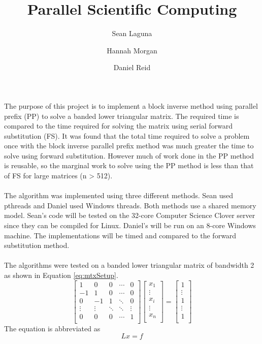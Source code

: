 \documentclass[a4paper,12pt]{article}
\title{Parallel Scientific Computing}
\author{Sean Laguna  \\
	\and 
	Hannah Morgan \\
	\and
	Daniel Reid \\
	}
\date{\vspace{-5ex}}
\begin{document}
\maketitle



\paragraph*{}
	The purpose of this project is to implement a block inverse method using parallel prefix (PP) to solve a banded lower triangular matrix.  The required time is compared to the time required for solving the matrix using serial forward substitution (FS).  It was found that the total time required to solve a problem once with the block inverse parallel prefix  method was much greater the time to solve using forward substitution.  However much of work done in the PP method is reusable, so the marginal work to solve using the PP method is less than that of FS for large matrices (n > 512).
\paragraph*{}
	The algorithm was implemented using three different methods.  Sean used pthreads and Daniel used Windows threads.  Both methods use a shared memory model.  Sean's code will be tested on the 32-core Computer Science Clover server since they can be compiled for Linux.  Daniel's will be run on an 8-core Windows machine.  The implementations will be timed and compared to the forward substitution method.

\paragraph*{}
	The algorithms were tested on a banded lower triangular matrix of bandwidth 2 as shown in Equation \ref{eq:mtxSetup}.
	\begin{equation} \label{eq:mtxSetup}
		\begin{bmatrix}
		1 & 0 & 0  &  \cdots & 0  \\
		-1  & 1  & 0&   \cdots & 0 \\
		0 & -1 & 1  & \ddots & 0 \\
		\vdots & \vdots & \ddots  & \ddots & \vdots\\
		 0 & 0 & 0 & \cdots &  1  \\
		\end{bmatrix}
		\begin{bmatrix}
		x_1\\
		\vdots \\
		x_i\\
		\vdots \\
		x_n\\
		\end{bmatrix} = 
		\begin{bmatrix}
		1\\
		\vdots \\
		1\\
		\vdots \\
		1\\
		\end{bmatrix}
	\end{equation}
	The equation is abbreviated as $$Lx=f$$
\end{document}
